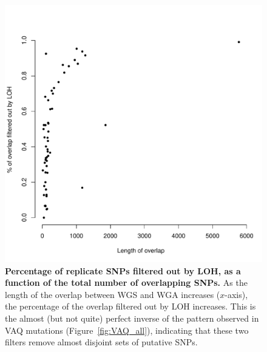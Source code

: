 \documentclass[11pt]{article} %
\begin{document}
{%
\begin{figure}
\centerline{
\includegraphics[width=5in]{./LOH_VAQ/LOH_all.pdf} }
\caption{\textbf{Percentage of replicate SNPs filtered out by LOH, as a function of the total number of overlapping SNPs.} As the length of the overlap between WGS and WGA increases ($x$-axis), the percentage of the overlap filtered out by LOH increases. This is the almost (but not quite) perfect inverse of the pattern observed in VAQ mutations (Figure~\ref{fig:VAQ_all}), indicating that these two filters remove almost disjoint sets of putative SNPs.}
\label{fig:LOH_all}
\end{figure}

}
\end{document}
